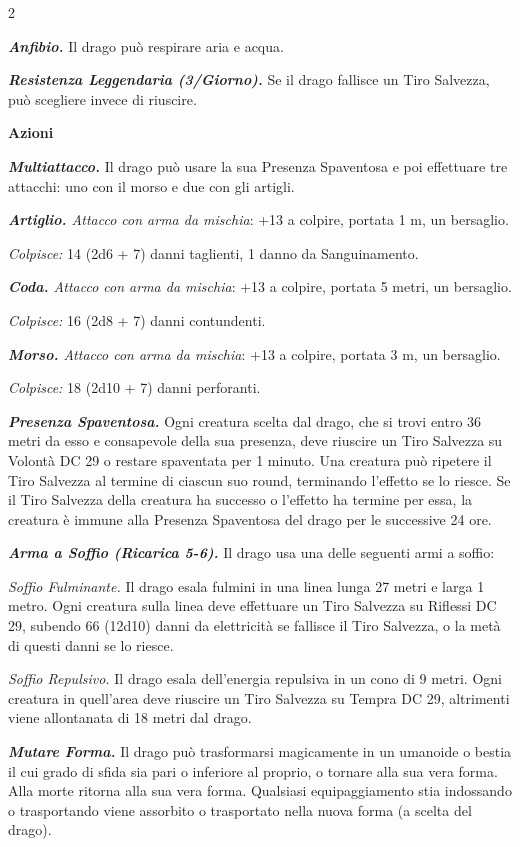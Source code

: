 \begin{multicols}{2}
{\emph{\textbf{Anfibio.}} Il drago può respirare aria e acqua.

\emph{\textbf{Resistenza Leggendaria (3/Giorno).}} Se il drago fallisce un Tiro Salvezza, può scegliere invece di riuscire.

\textbf{Azioni}

\emph{\textbf{Multiattacco.}} Il drago può usare la sua Presenza Spaventosa e poi effettuare tre attacchi: uno con il morso e due con gli artigli.

\emph{\textbf{Artiglio.} Attacco con arma da mischia}: +13 a colpire, portata 1 m, un bersaglio.

\emph{Colpisce:} 14 (2d6 + 7) danni taglienti, 1 danno da Sanguinamento.

\emph{\textbf{Coda.} Attacco con arma da mischia}: +13 a colpire, portata 5 metri, un bersaglio.

\emph{Colpisce:} 16 (2d8 + 7) danni contundenti.

\emph{\textbf{Morso.} Attacco con arma da mischia}: +13 a colpire, portata 3 m, un bersaglio.

\emph{Colpisce:} 18 (2d10 + 7) danni perforanti.

\emph{\textbf{Presenza Spaventosa.}} Ogni creatura scelta dal drago, che si trovi entro 36 metri da esso e consapevole della sua presenza, deve riuscire un Tiro Salvezza su Volontà DC 29 o restare spaventata per 1 minuto. Una creatura può ripetere il Tiro Salvezza al termine di ciascun suo round, terminando l'effetto se lo riesce. Se il Tiro Salvezza della creatura ha successo o l'effetto ha termine per essa, la creatura è immune alla Presenza Spaventosa del drago per le successive 24 ore.

\emph{\textbf{Arma a Soffio (Ricarica 5-6).}} Il drago usa una delle seguenti armi a soffio:

\emph{Soffio Fulminante.} Il drago esala fulmini in una linea lunga 27 metri e larga 1 metro. Ogni creatura sulla linea deve effettuare un Tiro Salvezza su Riflessi DC 29, subendo 66 (12d10) danni da elettricità se fallisce il Tiro Salvezza, o la metà di questi danni se lo riesce.

\emph{Soffio Repulsivo.} Il drago esala dell'energia repulsiva in un cono di 9 metri. Ogni creatura in quell'area deve riuscire un Tiro Salvezza su Tempra DC 29, altrimenti viene allontanata di 18 metri dal drago.

\emph{\textbf{Mutare Forma.}} Il drago può trasformarsi magicamente in un umanoide o bestia il cui grado di sfida sia pari o inferiore al proprio, o tornare alla sua vera forma. Alla morte ritorna alla sua vera forma. Qualsiasi equipaggiamento stia indossando o trasportando viene assorbito o trasportato nella nuova forma (a scelta del drago).

}
\end{multicols}
